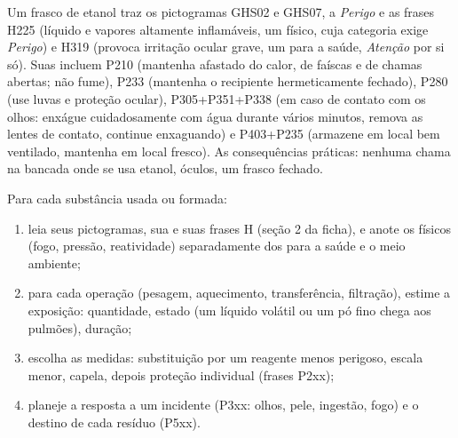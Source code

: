 \begin{example}
Um frasco de etanol traz os pictogramas GHS02 e GHS07, a  \emph{Perigo} e as frases H225 (líquido e vapores altamente
inflamáveis, um  físico, cuja categoria exige \emph{Perigo}) e H319
(provoca irritação ocular grave, um  para a saúde, \emph{Atenção}
por si só). Suas  incluem P210 (mantenha afastado do
calor, de faíscas e de chamas abertas; não fume), P233 (mantenha o
recipiente hermeticamente fechado), P280 (use luvas e proteção ocular),
P305+P351+P338 (em caso de contato com os olhos: enxágue cuidadosamente
com água durante vários minutos, remova as lentes de contato, continue
enxaguando) e P403+P235 (armazene em local bem ventilado, mantenha em
local fresco). As consequências práticas: nenhuma chama na bancada onde
se usa etanol, óculos, um frasco fechado.
\end{example}

\begin{method}\label{met:b1:lab-techniques-1:read-sds}
Para cada substância usada ou formada:
\begin{enumerate}
  \item leia seus pictogramas, sua  e suas frases H
        (seção 2 da ficha), e anote os  físicos (fogo, pressão,
        reatividade) separadamente dos  para a saúde e o meio ambiente;
  \item para cada operação (pesagem, aquecimento, transferência,
        filtração), estime a exposição: quantidade, estado (um líquido
        volátil ou um pó fino chega aos pulmões), duração;
  \item escolha as medidas: substituição por um reagente menos perigoso,
        escala menor, capela, depois proteção individual (frases P2xx);
  \item planeje a resposta a um incidente (P3xx: olhos, pele, ingestão,
        fogo) e o destino de cada resíduo (P5xx).
\end{enumerate}
\end{method}

